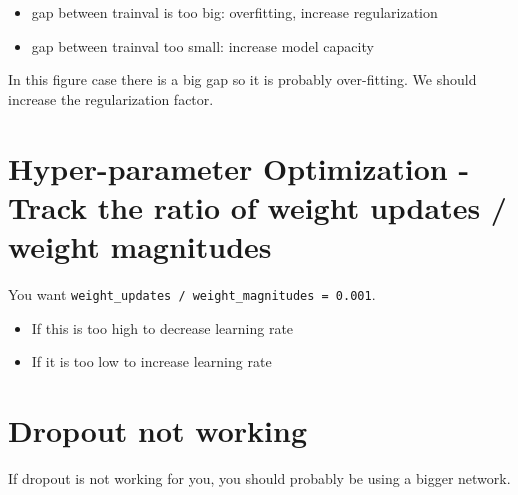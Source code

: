\begin{itemize}
\item gap between train\/val is too big: overfitting, increase regularization
\item gap between train\/val too small: increase model capacity
\end{itemize}

In this figure case there is a big gap so it is probably over-fitting. We should increase the regularization factor.

\section*{Hyper-parameter Optimization - Track the ratio of weight updates / weight magnitudes}
You want \texttt{weight\_updates / weight\_magnitudes =~0.001}.
\begin{itemize}
\item If this is too high to decrease learning rate
\item If it is too low to increase learning rate
\end{itemize}


\section*{Dropout not working}
If dropout is not working for you, you should probably be using a bigger network.
